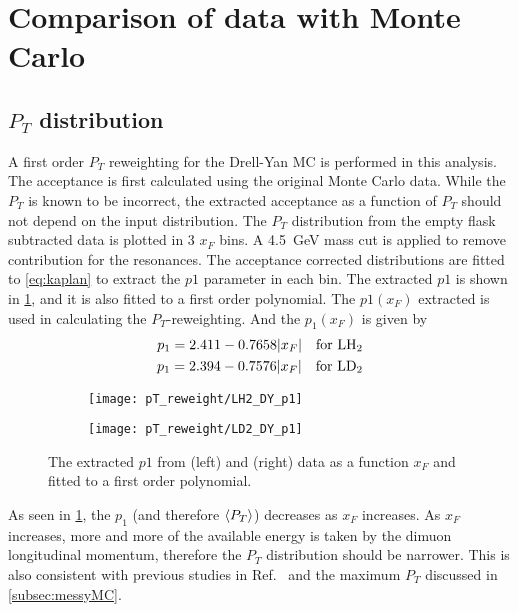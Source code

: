 \documentclass[../main.tex]{subfiles}
\begin{document}
\section{Comparison of data with Monte Carlo}

\subsection{\texorpdfstring{$P_T$}{P\_T} distribution}
A first order $P_T$ reweighting for the Drell-Yan MC is performed in this analysis. The acceptance is first
calculated using the original Monte Carlo data. While the $P_T$ is known to be incorrect,
the extracted acceptance as a function of $P_T$ should not depend on the input
distribution. The $P_T$ distribution from the empty flask subtracted data
is plotted in 3 $x_F$ bins. A \SI{4.5}{\GeV} mass cut is applied to remove contribution for the
resonances. The acceptance corrected distributions are fitted to \cref{eq:kaplan} to
extract the $p1$ parameter in each bin. The extracted $p1$ is shown in \cref{fig:p1_xF_DY},
and it is also fitted to a first order polynomial. The $p1(x_F)$ extracted is used in calculating
the $P_T$-reweighting. And the $p_1\left(x_F\right)$ is given by
\begin{equation}
	\begin{split}
		p_1 = 2.411 - 0.7658 \abs{x_F} \quad \text{for \ce{LH_2}} \\
		p_1 = 2.394 - 0.7576 \abs{x_F} \quad \text{for \ce{LD_2}}
	\end{split}
\end{equation}

\begin{figure}[h!]
	\centering
	\begin{subfigure}{0.45\linewidth}
		\texttt{[image: pT\_reweight/LH2\_DY\_p1]}
	\end{subfigure}
	\begin{subfigure}{0.45\linewidth}
		\texttt{[image: pT\_reweight/LD2\_DY\_p1]}
	\end{subfigure}
	\caption{The extracted $p1$ from  (left) and  (right) data as a function
		$x_F$ and fitted to a first order polynomial.}
	\label{fig:p1_xF_DY}
\end{figure}
As seen in \cref{fig:p1_xF_DY}, the $p_1$ (and therefore $\expval{P_T}$) decreases as $x_F$ increases.
As $x_F$ increases, more and more of the available energy is taken by the dimuon longitudinal momentum,
therefore the $P_T$ distribution should be narrower.
This is also consistent with previous studies in Ref.~\cite{prasad2020} and the maximum $P_T$ discussed in
\cref{subsec:messyMC}.
\end{document}
